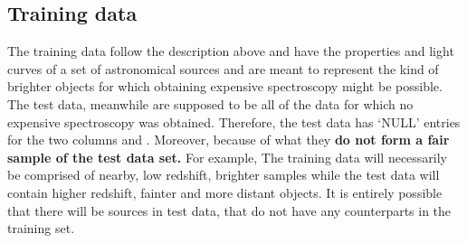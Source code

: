 \documentclass[\docopts]{\docclass}
\begin{document}
\subsection{Training data}
The training data follow the description above and have the properties and light curves of a set of {\numObjectsTraining} astronomical sources and are meant to represent the kind of brighter objects for which obtaining expensive spectroscopy might be possible. The test data, meanwhile are supposed to be all of the data for which no expensive spectroscopy was obtained. Therefore, the test data has `NULL' entries for the two columns {\specz} and {\class}. Moreover, because of what they \textbf{ do  not form a fair sample of the test data set.} For example, The training data will necessarily be comprised of nearby, low redshift, brighter samples while the test data will contain higher redshift, fainter and more distant objects. It is entirely possible that there will be sources in test data, that do not have any counterparts in the training set.


\end{document}
